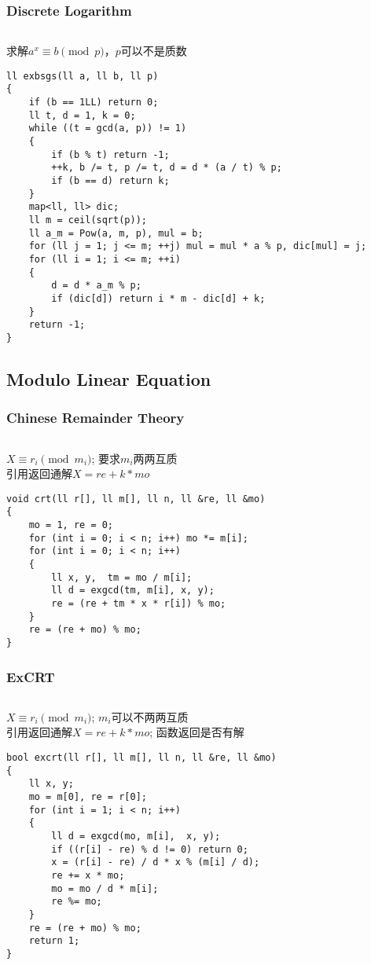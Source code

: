 \documentclass[twoside]{article}
\begin{document}
\subsubsection{Discrete Logarithm}
\begin{lstlisting}
\end{lstlisting}
求解$a ^ x \equiv b \pmod p$，$p$可以不是质数
\begin{lstlisting}
ll exbsgs(ll a, ll b, ll p)
{
    if (b == 1LL) return 0;
    ll t, d = 1, k = 0;
    while ((t = gcd(a, p)) != 1)
    {
        if (b % t) return -1;
        ++k, b /= t, p /= t, d = d * (a / t) % p;
        if (b == d) return k;
    }
    map<ll, ll> dic;
    ll m = ceil(sqrt(p));
    ll a_m = Pow(a, m, p), mul = b;
    for (ll j = 1; j <= m; ++j) mul = mul * a % p, dic[mul] = j;
    for (ll i = 1; i <= m; ++i)
    {
        d = d * a_m % p;
        if (dic[d]) return i * m - dic[d] + k;
    }
    return -1;
}\end{lstlisting}
\subsection{Modulo Linear Equation}
\subsubsection{Chinese Remainder Theory}
\begin{lstlisting}
\end{lstlisting}
$X \equiv r_i \pmod {m_i}$; 要求$m_i$两两互质\\
引用返回通解$X = re + k * mo$
\begin{lstlisting}
void crt(ll r[], ll m[], ll n, ll &re, ll &mo)
{
    mo = 1, re = 0;
    for (int i = 0; i < n; i++) mo *= m[i];
    for (int i = 0; i < n; i++)
    {
        ll x, y,  tm = mo / m[i];
        ll d = exgcd(tm, m[i], x, y);
        re = (re + tm * x * r[i]) % mo;
    }
    re = (re + mo) % mo;
}
\end{lstlisting}
\subsubsection{ExCRT}
\begin{lstlisting}
\end{lstlisting}
$X \equiv r_i \pmod {m_i}$; $m_i$可以不两两互质\\
引用返回通解$X = re + k * mo$; 函数返回是否有解
\begin{lstlisting}
bool excrt(ll r[], ll m[], ll n, ll &re, ll &mo)
{
    ll x, y;
    mo = m[0], re = r[0];
    for (int i = 1; i < n; i++)
    {
        ll d = exgcd(mo, m[i],  x, y);
        if ((r[i] - re) % d != 0) return 0;
        x = (r[i] - re) / d * x % (m[i] / d);
        re += x * mo;
        mo = mo / d * m[i];
        re %= mo;
    }
    re = (re + mo) % mo;
    return 1;
}
\end{lstlisting}
\end{document}
